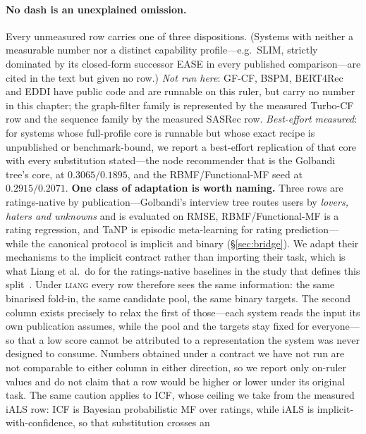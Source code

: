 \documentclass[11pt]{article}
\begin{document}
\paragraph{No dash is an unexplained omission.} Every unmeasured row carries one of three dispositions. (Systems with neither a measurable number nor a distinct capability profile---e.g.\ SLIM, strictly dominated by its closed-form successor EASE in every published comparison---are cited in the text but given no row.) \emph{Not run here}: GF-CF, BSPM, BERT4Rec and EDDI have public code and are runnable on this ruler, but carry no number in this chapter; the graph-filter family is represented by the measured Turbo-CF row and the sequence family by the measured SASRec row. \emph{Best-effort measured}: for systems whose full-profile core is runnable but whose exact recipe is unpublished or benchmark-bound, we report a best-effort replication of that core with every substitution stated---the node recommender that is the Golbandi tree's core, at $0.3065/0.1895$, and the RBMF/Functional-MF seed at $0.2915/0.2071$. \textbf{One class of adaptation is worth naming.} Three rows are ratings-native by publication---Golbandi's
interview tree routes users by \emph{lovers, haters and unknowns} and is evaluated on RMSE,
RBMF/Functional-MF is a rating regression, and TaNP is episodic meta-learning for rating prediction---while
the canonical protocol is implicit and binary (\S\ref{sec:bridge}). We adapt their mechanisms to the
implicit contract rather than importing their task, which is what Liang et al.\ do for the ratings-native
baselines in the study that defines this split~\cite{liang2018variational}. Under \textsc{liang} every row
therefore sees the same information: the same binarised fold-in, the same candidate pool, the same binary
targets. The second column exists precisely to relax the first of those---each system reads the input its
own publication assumes, while the pool and the targets stay fixed for everyone---so that a low score
cannot be attributed to a representation the system was never designed to consume. Numbers obtained under
a contract we have not run are not comparable to either column in either direction, so we
report only on-ruler values and do not claim that a row would be higher or lower under its original task.
The same caution applies to ICF, whose ceiling we take from the measured iALS row: ICF is Bayesian
probabilistic MF over ratings, while iALS is implicit-with-confidence, so that substitution crosses an
\end{document}
